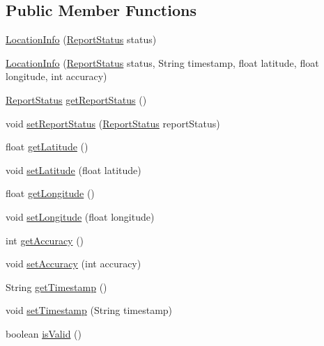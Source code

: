 \subsection*{Public Member Functions}
\begin{DoxyCompactItemize}
\item 
\hyperlink{classcom_1_1bluevia_1_1location_1_1data_1_1LocationInfo_a6e3cd2a5f533d4eeb4977a9746d18b6f}{LocationInfo} (\hyperlink{classcom_1_1bluevia_1_1location_1_1data_1_1LocationInfo_aab9819d3c89265c055e64b69da1bab9e}{ReportStatus} status)
\item 
\hyperlink{classcom_1_1bluevia_1_1location_1_1data_1_1LocationInfo_aa754d6e636b8fdef8f1d3174c89fb8fd}{LocationInfo} (\hyperlink{classcom_1_1bluevia_1_1location_1_1data_1_1LocationInfo_aab9819d3c89265c055e64b69da1bab9e}{ReportStatus} status, String timestamp, float latitude, float longitude, int accuracy)
\item 
\hyperlink{classcom_1_1bluevia_1_1location_1_1data_1_1LocationInfo_aab9819d3c89265c055e64b69da1bab9e}{ReportStatus} \hyperlink{classcom_1_1bluevia_1_1location_1_1data_1_1LocationInfo_ab92e9150dbd2a6aff848a086ddd49426}{getReportStatus} ()
\item 
void \hyperlink{classcom_1_1bluevia_1_1location_1_1data_1_1LocationInfo_a486a44ad76aa9812f0132c57ac089e1a}{setReportStatus} (\hyperlink{classcom_1_1bluevia_1_1location_1_1data_1_1LocationInfo_aab9819d3c89265c055e64b69da1bab9e}{ReportStatus} reportStatus)
\item 
float \hyperlink{classcom_1_1bluevia_1_1location_1_1data_1_1LocationInfo_a2377eda77a9936d4658ee6821fb1a868}{getLatitude} ()
\item 
void \hyperlink{classcom_1_1bluevia_1_1location_1_1data_1_1LocationInfo_a24b9b8e62e5e3d78c87e40e1f126b709}{setLatitude} (float latitude)
\item 
float \hyperlink{classcom_1_1bluevia_1_1location_1_1data_1_1LocationInfo_ab6403be15860f9b83988589ada93ab1a}{getLongitude} ()
\item 
void \hyperlink{classcom_1_1bluevia_1_1location_1_1data_1_1LocationInfo_a9dc4145afc3a4922b35347474daf5c88}{setLongitude} (float longitude)
\item 
int \hyperlink{classcom_1_1bluevia_1_1location_1_1data_1_1LocationInfo_a07de3a65b84ea5f927420bda7953729d}{getAccuracy} ()
\item 
void \hyperlink{classcom_1_1bluevia_1_1location_1_1data_1_1LocationInfo_ad485b24867086c7a5f72a042e6387c8c}{setAccuracy} (int accuracy)
\item 
String \hyperlink{classcom_1_1bluevia_1_1location_1_1data_1_1LocationInfo_afce05c11665e558e21ad86a58a721349}{getTimestamp} ()
\item 
void \hyperlink{classcom_1_1bluevia_1_1location_1_1data_1_1LocationInfo_a6a4f95e5ac1095ce27684a305842fcec}{setTimestamp} (String timestamp)
\item 
boolean \hyperlink{classcom_1_1bluevia_1_1location_1_1data_1_1LocationInfo_a19ebaf31f854011a7bcf8aeba79ede9d}{isValid} ()
\end{DoxyCompactItemize}


